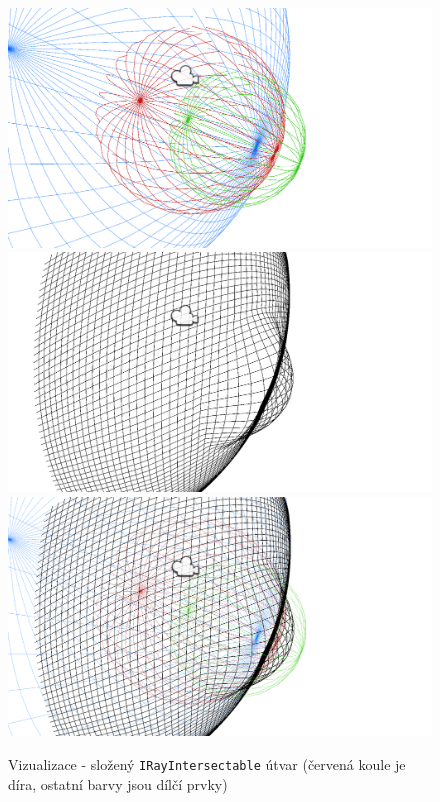  
\begin{figure}[p]\centering
    \center
    \includegraphics[width=135mm]{../img/IRayIntersectable-spheres.png}
    \includegraphics[width=135mm]{../img/IRayIntersectable-result.png}
    \includegraphics[width=135mm]{../img/IRayIntersectable-both.png}
    \caption{Vizualizace - složený \texttt{IRayIntersectable} útvar (červená koule je díra, ostatní barvy jsou dílčí prvky)}
    \label{obr04:IRayIntersectableVisualization}
\end{figure} 


